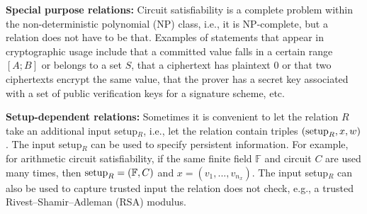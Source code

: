 \textbf{Special purpose relations:} Circuit satisfiability is 
a complete problem within the non-deterministic polynomial (NP) class,
i.e., it is NP-complete,
but a relation does not have to be that. 
	Examples of statements that appear in cryptographic usage include that a committed value falls in a certain range $[A;B]$ or belongs to a set $S$, that a ciphertext has plaintext 0 or that two ciphertexts encrypt the same value, that the prover has a secret key associated with a set of public verification keys for a signature scheme, etc.


\textbf{Setup-dependent relations:} 
	Sometimes it is convenient to let the relation $R$ take an additional input setup$_R$, i.e., let the relation contain triples $(\textmd{setup}_R, x, w)$. 
	The input setup$_R$ can be used to specify persistent information.
	For example, for arithmetic circuit satisfiability, if the same finite field $\mathbb{F}$ and circuit $C$ are used many times, 
then $\textmd{setup}_R = (\mathbb{F}, C)$ and $x = (v_1,...,v_{n_x})$.
	The input setup$_R$ can also be used to capture trusted input the relation does not check, 
e.g., a trusted Rivest--Shamir--Adleman (RSA) modulus.

